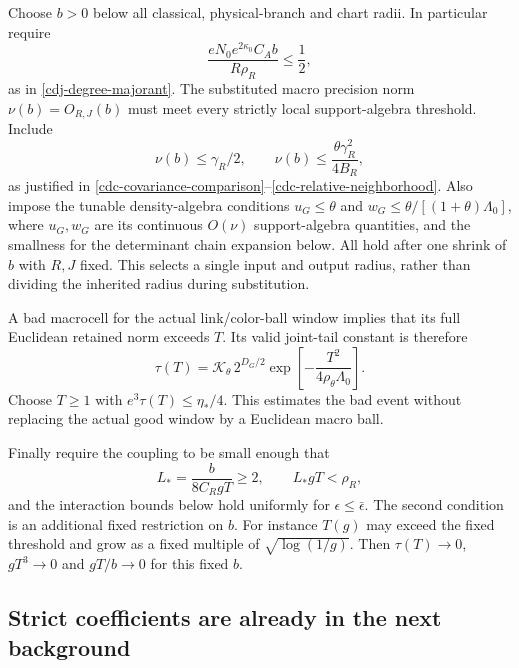 Choose $b>0$ below all classical, physical-branch and chart
radii. In particular require
\begin{equation}
 \frac{eN_0e^{2\kappa_0}C_A b}{R\rho_R}\le\frac12,
 \label{cdm-joint-domain}
\end{equation}
as in \eqref{cdj-degree-majorant}. The substituted macro
precision norm $\nu(b)=O_{R,J}(b)$ must meet every strictly
local support-algebra threshold. Include
\begin{equation}
 \nu(b)\le\gamma_R/2,\qquad
 \nu(b)\le\frac{\theta\gamma_R^2}{4B_R},
 \label{cdm-precision-small}
\end{equation}
as justified in
\eqref{cdc-covariance-comparison}--\eqref{cdc-relative-neighborhood}.
Also impose the tunable density-algebra conditions
$u_G\le\theta$ and
$w_G\le\theta/[(1+\theta)\Lambda_0]$, where $u_G,w_G$
are its continuous $O(\nu)$ support-algebra quantities, and
the smallness for the determinant chain expansion below.
All hold after one shrink of $b$ with $R,J$ fixed.
This selects a single input and output radius, rather than
dividing the inherited radius during substitution.

A bad macrocell for the actual link/color-ball window implies
that its full Euclidean retained norm exceeds $T$. Its valid
joint-tail constant is therefore
\begin{equation}
 \tau(T)=\mathcal K_\theta\,2^{D_G/2}
       \exp\left[-\frac{T^2}{4\rho_\theta\Lambda_0}\right].
 \label{cdm-tail-constant}
\end{equation}
Choose $T\ge1$ with $e^3\tau(T)\le\eta_*/4$.
This estimates the bad event without replacing the actual
good window by a Euclidean macro ball.

Finally require the coupling to be small enough that
\begin{equation}
 L_*=\frac{b}{8C_RgT}\ge2,\qquad L_*gT<\rho_R,
 \label{cdm-lambda-radius}
\end{equation}
and the interaction bounds below hold uniformly for
$\epsilon\le\bar\epsilon$. The second condition is an
additional fixed restriction on $b$. For instance $T(g)$
may exceed the fixed threshold and grow as a fixed multiple
of $\sqrt{\log(1/g)}$. Then $\tau(T)\to0$, $gT^3\to0$ and
$gT/b\to0$ for this fixed $b$.

\subsection{Strict coefficients are already in the next background}
\label{cdm-support-section}

